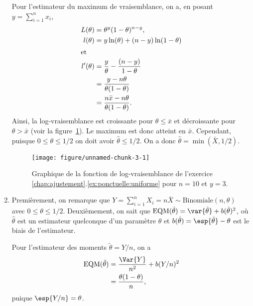 \begin{exercice}
\begin{sol}
\begin{enumerate}
      Pour l'estimateur du maximum de vraisemblance, on a, en posant
      $y = \sum_{i = 1}^n x_i$,
      \begin{align*}
        L(\theta) &= \theta^{y} (1 - \theta)^{n - y}, \\
        l(\theta) &= y \ln(\theta) + (n - y) \ln(1 - \theta) \\
        \intertext{et}
        l^\prime(\theta) &= \frac{y}{\theta} - \frac{(n - y)}{1 - \theta}\\
        &= \frac{y - n\theta}{\theta (1 - \theta)}\\
        &= \frac{n \bar{x} - n \theta}{\theta (1 - \theta)}.
      \end{align*}
      Ainsi, la log-vraisemblance est croissante pour $\theta \leq
      \bar{x}$ et décroissante pour $\theta > \bar{x}$ (voir la
      figure~\ref{fig:ponctuelle:uniforme}). Le maximum est donc
      atteint en $\bar{x}$. Cependant, puisque $0 \leq \theta \leq
      1/2$ on doit avoir $\hat{\theta} \leq 1/2$. On a donc
      $\hat{\theta} = \min(\bar{X}, 1/2)$.
      \begin{figure}
        \centering
\begin{knitrout}
\color{fgcolor}
\texttt{[image: figure/unnamed-chunk-3-1]} 
\end{knitrout}
        \caption{Graphique de la fonction de log-vraisemblance de
          l'exercice
          \ref{chap:ajustement}.\ref{ex:ponctuelle:uniforme} pour $n =
          10$ et $y = 3$.}
        \label{fig:ponctuelle:uniforme}
      \end{figure}
    \item Premièrement, on remarque que $Y = \sum_{i = 1}^n X_i = n
      \bar{X} \sim \text{Binomiale}(n, \theta)$ avec $0 \leq \theta
      \leq 1/2$. Deuxièmement, on sait que $\mbox{EQM}(\hat{\theta}) =
      \var{\hat{\theta}} + b(\hat{\theta})^2$, où $\hat{\theta}$ est
      un estimateur quelconque d'un paramètre $\theta$ et
      $b(\hat{\theta}) = \esp{\hat{\theta}} - \theta$ est le biais de
      l'estimateur.

      Pour l'estimateur des moments $\tilde{\theta} = Y/n$, on a
      \begin{align*}
        \mbox{EQM}(\tilde{\theta}) &= \frac{\Var{Y}}{n^2} +
        b(Y/n)^2 \\
        &= \frac{\theta (1 - \theta)}{n},
      \end{align*}
      puique $\esp{Y/n} = \theta$.


\end{enumerate}
\end{sol}
\end{exercice}
